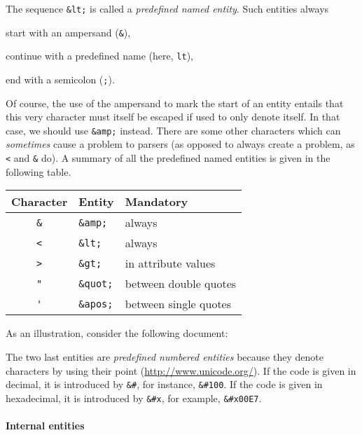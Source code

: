 The sequence \verb|&lt;| is called a \emph{predefined named entity}.
Such entities always
\begin{enumerate*}
 
  \item start with an ampersand (\verb|&|), 

  \item continue with a predefined name (here, \texttt{lt}),

  \item end with a semicolon (\texttt{;}).

\end{enumerate*}
Of course, the use of the ampersand to mark the start of an entity
entails that this very character must itself be escaped if used to
only denote itself. In that case, we should use \verb|&amp;|
instead. There are some other characters which can \emph{sometimes}
cause a problem to \XML parsers (as opposed to always create a
problem, as \verb|<| and \verb|&| do).  A summary of all the
predefined named entities is given in the following table.
\begin{center}
\begin{tabular}{cll}
\toprule
\textsf{Character} & \textsf{Entity} & \textsf{Mandatory}\\
\midrule
\verb|&| & \verb|&amp;|  & always\\
\verb|<| & \verb|&lt;|   & always\\
\verb|>| & \verb|&gt;|   & in attribute values\\
\verb|"| & \verb|&quot;| & between double quotes\\
\verb|'| & \verb|&apos;| & between single quotes\\
\bottomrule
\end{tabular}
\end{center}

\noindent As an illustration, consider the following document:

\noindent The two last entities are \emph{predefined numbered
  entities} because they denote characters by using their \Unicode
point (\url{http://www.unicode.org/}). If the code is given in
decimal, it is introduced by \verb|&#|, for instance, \verb|&#100|. If
the code is given in hexadecimal, it is introduced by \verb|&#x|, for
example, \verb|&#x00E7|.

\paragraph{Internal entities}

